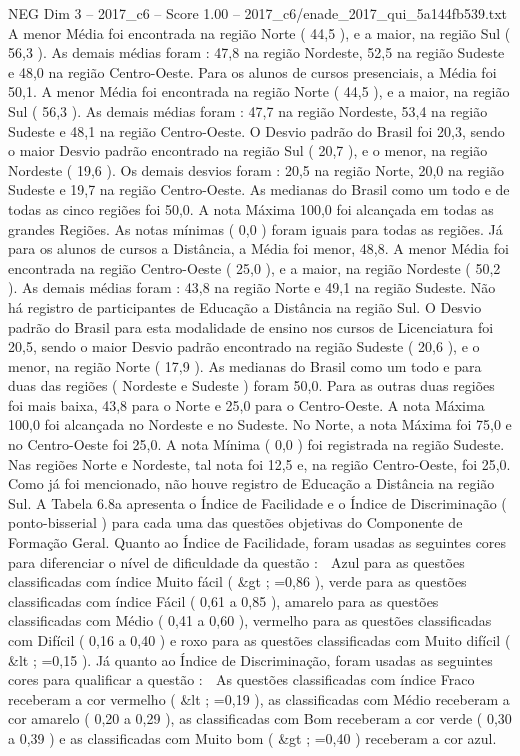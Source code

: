 \begin{textsample}{NEG Dim 3 – 2017\_c6 – Score 1.00 – 2017\_c6/enade\_2017\_qui\_5a144fb539.txt}
A menor Média foi encontrada na região Norte ( 44,5 ), e a maior, na região Sul ( 56,3 ).
As demais médias foram : 47,8 na região Nordeste, 52,5 na região Sudeste e 48,0 na região Centro-Oeste.
Para os alunos de cursos presenciais, a Média foi 50,1.
A menor Média foi encontrada na região Norte ( 44,5 ), e a maior, na região Sul ( 56,3 ).
As demais médias foram : 47,7 na região Nordeste, 53,4 na região Sudeste e 48,1 na região Centro-Oeste.
O Desvio padrão do Brasil foi 20,3, sendo o maior Desvio padrão encontrado na região Sul ( 20,7 ), e o menor, na região Nordeste ( 19,6 ).
Os demais desvios foram : 20,5 na região Norte, 20,0 na região Sudeste e 19,7 na região Centro-Oeste.
As medianas do Brasil como um todo e de todas as cinco regiões foi 50,0.
A nota Máxima 100,0 foi alcançada em todas as grandes Regiões.
As notas mínimas ( 0,0 ) foram iguais para todas as regiões.
Já para os alunos de cursos a Distância, a Média foi menor, 48,8.
A menor Média foi encontrada na região Centro-Oeste ( 25,0 ), e a maior, na região Nordeste ( 50,2 ).
As demais médias foram : 43,8 na região Norte e 49,1 na região Sudeste.
Não há registro de participantes de Educação a Distância na região Sul.
O Desvio padrão do Brasil para esta modalidade de ensino nos cursos de Licenciatura foi 20,5, sendo o maior Desvio padrão encontrado na região Sudeste ( 20,6 ), e o menor, na região Norte ( 17,9 ).
As medianas do Brasil como um todo e para duas das regiões ( Nordeste e Sudeste ) foram 50,0.
Para as outras duas regiões foi mais baixa, 43,8 para o Norte e 25,0 para o Centro-Oeste.
A nota Máxima 100,0 foi alcançada no Nordeste e no Sudeste.
No Norte, a nota Máxima foi 75,0 e no Centro-Oeste foi 25,0.
A nota Mínima ( 0,0 ) foi registrada na região Sudeste.
Nas regiões Norte e Nordeste, tal nota foi 12,5 e, na região Centro-Oeste, foi 25,0.
Como já foi mencionado, não houve registro de Educação a Distância na região Sul.
A Tabela 6.8a apresenta o Índice de Facilidade e o Índice de Discriminação ( ponto-bisserial ) para cada uma das questões objetivas do Componente de Formação Geral.
Quanto ao Índice de Facilidade, foram usadas as seguintes cores para diferenciar o nível de dificuldade da questão :  Azul para as questões classificadas com índice Muito fácil ( \&gt ; =0,86 ), verde para as questões classificadas com índice Fácil ( 0,61 a 0,85 ), amarelo para as questões classificadas com Médio ( 0,41 a 0,60 ), vermelho para as questões classificadas com Difícil ( 0,16 a 0,40 ) e roxo para as questões classificadas com Muito difícil ( \&lt ; =0,15 ).
Já quanto ao Índice de Discriminação, foram usadas as seguintes cores para qualificar a questão :  As questões classificadas com índice Fraco receberam a cor vermelho ( \&lt ; =0,19 ), as classificadas com Médio receberam a cor amarelo ( 0,20 a 0,29 ), as classificadas com Bom receberam a cor verde ( 0,30 a 0,39 ) e as classificadas com Muito bom ( \&gt ; =0,40 ) receberam a cor azul.

\end{textsample}
